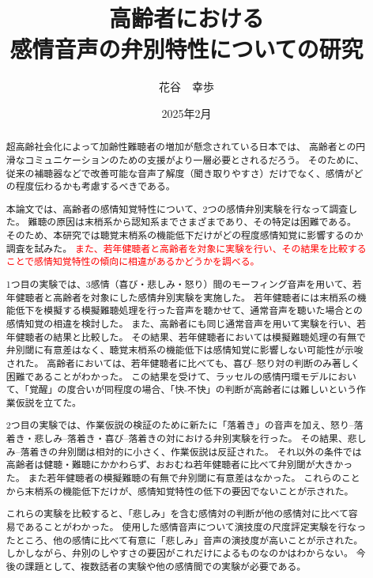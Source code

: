 \documentclass[11pt]{jreport}
\title{高齢者における\\感情音声の弁別特性についての研究}
\author{花谷　幸歩}
\date{2025年2月}	%
\begin{document}
\maketitle



\begin{abstract}
超高齢社会化によって加齢性難聴者の増加が懸念されている日本では、
高齢者との円滑なコミュニケーションのための支援がより一層必要とされるだろう。
そのために、従来の補聴器などで改善可能な音声了解度（聞き取りやすさ）だけでなく、感情がどの程度伝わるかも考慮するべきである。

本論文では、高齢者の感情知覚特性について、2つの感情弁別実験を行なって調査した。
難聴の原因は末梢系から認知系までさまざまであり、その特定は困難である。
そのため、本研究では聴覚末梢系の機能低下だけがどの程度感情知覚に影響するのか調査を試みた。
\textcolor{red}{また、若年健聴者と高齢者を対象に実験を行い、その結果を比較することで感情知覚特性の傾向に相違があるかどうかを調べる。}

1つ目の実験では、3感情（喜び・悲しみ・怒り）間のモーフィング音声を用いて、若年健聴者と高齢者を対象にした感情弁別実験を実施した。
若年健聴者には末梢系の機能低下を模擬する模擬難聴処理を行った音声を聴かせて、通常音声を聴いた場合との感情知覚の相違を検討した。
また、高齢者にも同じ通常音声を用いて実験を行い、若年健聴者の結果と比較した。
その結果、若年健聴者においては模擬難聴処理の有無で弁別閾に有意差はなく、聴覚末梢系の機能低下は感情知覚に影響しない可能性が示唆された。
高齢者においては、若年健聴者に比べても、喜び--怒り対の判断のみ著しく困難であることがわかった。
この結果を受けて、ラッセルの感情円環モデルにおいて、「覚醒」の度合いが同程度の場合、「快-不快」の判断が高齢者には難しいという作業仮説を立てた。

2つ目の実験では、作業仮説の検証のために新たに「落着き」の音声を加え、怒り--落着き・悲しみ--落着き・喜び--落着きの対における弁別実験を行った。
その結果、悲しみ--落着きの弁別閾は相対的に小さく、作業仮説は反証された。
それ以外の条件では高齢者は健聴・難聴にかかわらず、おおむね若年健聴者に比べて弁別閾が大きかった。 
また若年健聴者の模擬難聴の有無で弁別閾に有意差はなかった。
これらのことから末梢系の機能低下だけが、感情知覚特性の低下の要因でないことが示された。

これらの実験を比較すると、「悲しみ」を含む感情対の判断が他の感情対に比べて容易であることがわかった。
使用した感情音声について演技度の尺度評定実験を行なったところ、他の感情に比べて有意に「悲しみ」音声の演技度が高いことが示された。
しかしながら、弁別のしやすさの要因がこれだけによるものなのかはわからない。
今後の課題として、複数話者の実験や他の感情間での実験が必要である。




\end{abstract}
\end{document}
